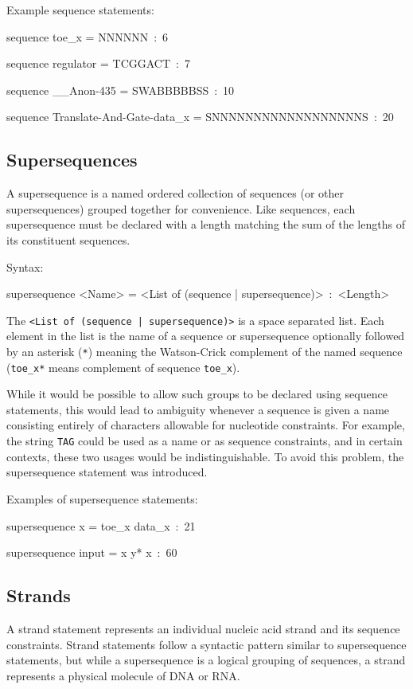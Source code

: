 \documentclass{article}
\newenvironment{code}
{\vspace{-0.1in}\par\begin{list}{}{
\setlength{\listparindent}{0pt}
\raggedright
\setlength{\itemsep}{0pt}
\setlength{\parsep}{0pt}
\normalfont\ttfamily}
 \item[]}
{\end{list}\vspace{-0.1in}}
\begin{document}
Example sequence statements:
\begin{code}
sequence toe\_x = NNNNNN~:~6

sequence regulator = TCGGACT~:~7

sequence \_\_Anon-435 = SWABBBBBSS~:~10

sequence Translate-And-Gate-data\_x = SNNNNNNNNNNNNNNNNNNS~:~20
\end{code}

\subsection{Supersequences}

A supersequence is a named ordered collection of sequences (or other supersequences) grouped together for convenience. Like sequences, each supersequence must be declared with a length matching the sum of the lengths of its constituent sequences.

Syntax:
\begin{code}
supersequence <Name> = <List of (sequence | supersequence)>~:~<Length>
\end{code}
The \texttt{<List of (sequence | supersequence)>} is a space separated list. Each element in the list is the name of a sequence or supersequence optionally followed by an asterisk (\texttt{*}) meaning the Watson-Crick complement of the named sequence (\texttt{toe\_x*} means complement of sequence \texttt{toe\_x}).

While it would be possible to allow such groups to be declared using sequence statements, this would lead to ambiguity whenever a sequence is given a name consisting entirely of characters allowable for nucleotide constraints. For example, the string \texttt{TAG} could be used as a name or as sequence constraints, and in certain contexts, these two usages would be indistinguishable. To avoid this problem, the supersequence statement was introduced.

Examples of supersequence statements:
\begin{code}
supersequence x = toe\_x data\_x~:~21

supersequence input = x y{*} x~:~60
\end{code}

\subsection{Strands}

A strand statement represents an individual nucleic acid strand and its sequence constraints. Strand statements follow a syntactic pattern similar to supersequence statements, but while a supersequence is a logical grouping of sequences, a strand represents a physical molecule of DNA or RNA.
\end{document}
